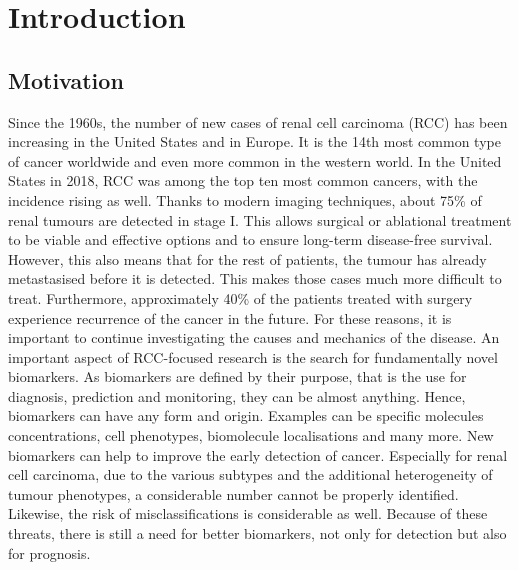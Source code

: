 
\chapter{Introduction}\label{Introduction}

\section{Motivation}

Since the 1960s, the number of new cases of renal cell carcinoma (RCC) has been increasing in the United States and in Europe. It is the 14th most common type of cancer worldwide \cite{Hancock2023Kidney} and even more common in the western world. In the United States in 2018, RCC was among the top ten most common cancers, with the incidence rising as well. \cite{Chowdhury2020Kidney} 
Thanks to modern imaging techniques, about 75\% of renal tumours are detected in stage I. This allows surgical or ablational treatment to be viable and effective options and to ensure long-term disease-free survival. \cite{Hancock2023Kidney}
However, this also means that for the rest of patients, the tumour has already metastasised before it is detected. This makes those cases much more difficult to treat. Furthermore, approximately 40\% of the patients treated with surgery experience recurrence of the cancer in the future. \cite{Hancock2023Kidney}
For these reasons, it is important to continue investigating the causes and mechanics of the disease. An important aspect of RCC-focused research is the search for fundamentally novel biomarkers.
As biomarkers are defined by their purpose, that is the use for diagnosis, prediction and monitoring, they can be almost anything. Hence, biomarkers can have any form and origin. 
Examples can be specific molecules concentrations, cell phenotypes, biomolecule localisations and many more. New biomarkers can help to improve the early detection of cancer. Especially for renal cell carcinoma, due to the various subtypes and the additional heterogeneity of tumour phenotypes, a considerable number cannot be properly identified. \cite{Hsieh2017Renal} Likewise, the risk of misclassifications is considerable as well. Because of these threats, there is still a need for better biomarkers, not only for detection but also for prognosis.
